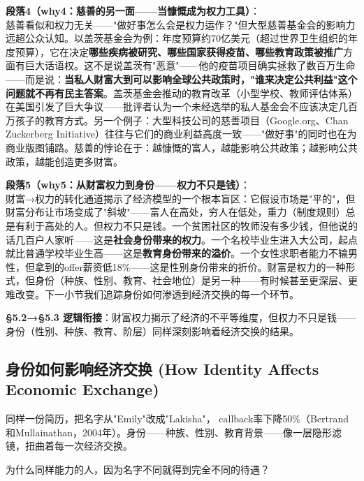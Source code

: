 \documentclass[../main.tex]{subfiles}
\begin{document}
	\textbf{段落4（why4：慈善的另一面——当慷慨成为权力工具）}：\\
	慈善看似和权力无关——"做好事怎么会是权力运作？"但大型慈善基金会的影响力远超公众认知。以盖茨基金会为例：年度预算约70亿美元（超过世界卫生组织的年度预算），它在决定\textbf{哪些疾病被研究、哪些国家获得疫苗、哪些教育政策被推广}方面有巨大话语权。这不是说盖茨有"恶意"——他的疫苗项目确实拯救了数百万生命——而是说：\textbf{当私人财富大到可以影响全球公共政策时，"谁来决定公共利益"这个问题就不再有民主答案}。盖茨基金会推动的教育改革（小型学校、教师评估体系）在美国引发了巨大争议——批评者认为一个未经选举的私人基金会不应该决定几百万孩子的教育方式。另一个例子：大型科技公司的慈善项目（Google.org、Chan Zuckerberg Initiative）往往与它们的商业利益高度一致——"做好事"的同时也在为商业版图铺路。慈善的悖论在于：越慷慨的富人，越能影响公共政策；越影响公共政策，越能创造更多财富。

	\textbf{段落5（why5：从财富权力到身份——权力不只是钱）}：\\
	财富→权力的转化通道揭示了经济模型的一个根本盲区：它假设市场是"平的"，但财富分布让市场变成了"斜坡"——富人在高处，穷人在低处，重力（制度规则）总是有利于高处的人。但权力不只是钱。一个贫困社区的牧师没有多少钱，但他说的话几百户人家听——这是\textbf{社会身份带来的权力}。一个名校毕业生进入大公司，起点就比普通学校毕业生高——这是\textbf{教育身份带来的溢价}。一个女性求职者能力不输男性，但拿到的offer薪资低18\%——这是性别身份带来的折价。财富是权力的一种形式，但身份（种族、性别、教育、社会地位）是另一种——有时候甚至更深层、更难改变。下一小节我们追踪身份如何渗透到经济交换的每一个环节。

	\textbf{§5.2→§5.3 逻辑衔接}：财富权力揭示了经济的不平等维度，但权力不只是钱——身份（性别、种族、教育、阶层）同样深刻影响着经济交换的结果。

	\subsection{身份如何影响经济交换 (How Identity Affects Economic Exchange)}
	\begin{motivation}
		同样一份简历，把名字从"Emily"改成"Lakisha"， callback率下降50\%（Bertrand和Mullainathan，2004年）。身份——种族、性别、教育背景——像一层隐形滤镜，扭曲着每一次经济交换。
	\end{motivation}
	\begin{questionbox}
		为什么同样能力的人，因为名字不同就得到完全不同的待遇？
	\end{questionbox}
\end{document}
